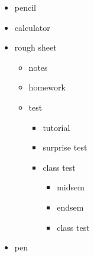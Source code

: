 \documentclass[11pt]{article}
\begin{document}
\begin{itemize}

\item[] pencil
\item[] calculator
\item[] rough sheet
	\begin{itemize}
	\item notes
	\item homework
	\item test
		\begin{itemize}
		\item tutorial
		\item surprise test
		\item class test
			\begin{itemize}
			\item midsem
			\item endsem
			\item class test
			\end{itemize}
		\end{itemize}
	\end{itemize}
\item[] pen
\end{itemize}
\end{document}
